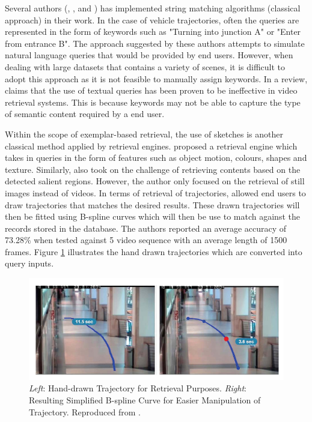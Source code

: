 Several authors (, \cite{momin2015vehicle}, and
\cite{yang2015semantic}) has implemented string matching algorithms (classical
approach) in their work. In the case of vehicle trajectories, often the queries
are represented in the form of keywords such as "Turning into junction A" or
"Enter from entrance B". The approach suggested by these authors attempts to
simulate natural language queries that would be provided by end users. However,
when dealing with large datasets that contains a variety of scenes, it is
difficult to adopt this approach as it is not feasible to manually assign
keywords. In a review,  claims that the use of textual
queries has been proven to be ineffective in video retrieval systems. This is
because keywords may not be able to capture the type of semantic content
required by a end user.

Within the scope of exemplar-based retrieval, the use of sketches is
another classical method applied by retrieval engines. 
proposed a retrieval engine which takes in queries in the form of features such
as object motion, colours, shapes and texture. Similarly,
 also took on the challenge of retrieving contents based
on the detected salient regions. However, the author only focused on the
retrieval of still images instead of videos. In terms of retrieval of
trajectories,  allowed end users to draw trajectories that
matches the desired results. These drawn trajectories will then be fitted using
B-spline curves which will then be use to match against the records stored in
the database. The authors reported an average accuracy of 73.28\% when tested
against 5 video sequence with an average length of 1500 frames. Figure
\ref{fig:drawquery1} illustrates the hand drawn trajectories which are converted
into query inputs.


\begin{figure}[hbt!]
  \centering
  \includegraphics[width=.9\textwidth]{image/lit/trajdraw1.PNG}
  \caption[\textit{Left}: Hand-drawn Trajectory for Retrieval Purposes.
  \textit{Right}: Resulting Simplified B-spline Curve for Easier Manipulation of
  Trajectory] {\textit{Left}: Hand-drawn Trajectory for Retrieval Purposes.
  \textit{Right}: Resulting Simplified B-spline Curve for Easier Manipulation of
  Trajectory. Reproduced from .}
  \label{fig:drawquery1}
\end{figure}

